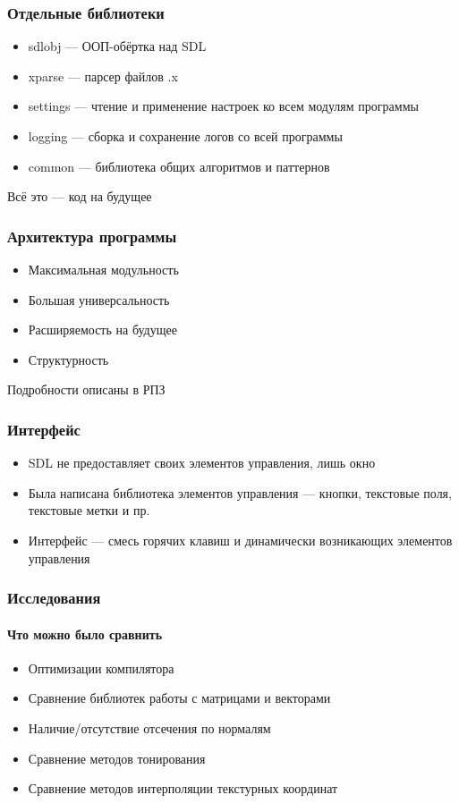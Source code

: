 \documentclass{beamer}
\begin{document}
\begin{frame}
\frametitle{Отдельные библиотеки}

\begin{itemize}
\item sdlobj --- ООП-обёртка над SDL
\item xparse --- парсер файлов .x
\item settings --- чтение и применение настроек ко всем модулям программы
\item logging --- сборка и сохранение логов со всей программы
\item common --- библиотека общих алгоритмов и паттернов
\end{itemize}
Всё это --- код на будущее
\end{frame}

\begin{frame}
\frametitle{Архитектура программы}

\begin{itemize}
\item Максимальная модульность
\item Большая универсальность
\item Расширяемость на будущее
\item Структурность
\end{itemize}
Подробности описаны в РПЗ
\end{frame}

\begin{frame}
\frametitle{Интерфейс}

\begin{itemize}
\item SDL не предоставляет своих элементов управления, лишь окно
\item Была написана библиотека элементов управления --- кнопки, текстовые поля, текстовые метки и пр.
\item Интерфейс --- смесь горячих клавиш и динамически возникающих элементов управления
\end{itemize}
\end{frame}

\begin{frame}
\frametitle{Исследования}
\framesubtitle{Что можно было сравнить}

\begin{itemize}
\item Оптимизации компилятора
\item Сравнение библиотек работы с матрицами и векторами
\item Наличие/отсутствие отсечения по нормалям
\item Сравнение методов тонирования
\item Сравнение методов интерполяции текстурных координат
\end{itemize}
\end{frame}
\end{document}
